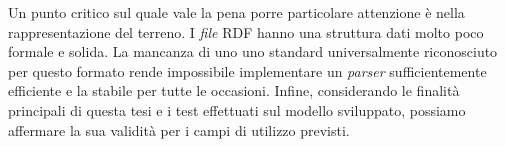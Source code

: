 Un punto critico sul quale vale la pena porre particolare attenzione è nella rappresentazione del terreno. I \textit{file} \ac{RDF} hanno una struttura dati molto poco formale e solida. La mancanza di uno uno standard universalmente riconosciuto per questo formato rende impossibile implementare un \textit{parser} sufficientemente efficiente e la stabile per tutte le occasioni.
Infine, considerando le finalità principali di questa tesi e i test effettuati sul modello sviluppato, possiamo affermare la sua validità per i campi di utilizzo previsti.





